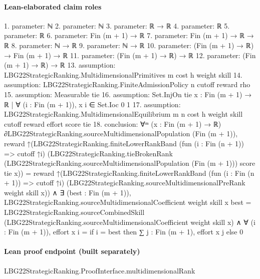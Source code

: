 \documentclass[10pt]{article}
\begin{document}
\paragraph{Lean-elaborated claim roles}\begin{ReviewVerbatim}
1. parameter: ℕ
2. parameter: ℕ
3. parameter: ℝ → ℝ
4. parameter: ℝ
5. parameter: ℝ
6. parameter: Fin (m + 1) → ℝ
7. parameter: Fin (m + 1) → ℝ → ℝ
8. parameter: ℕ → ℝ
9. parameter: ℕ → ℝ
10. parameter: (Fin (m + 1) → ℝ) → Fin (m + 1) → ℝ
11. parameter: (Fin (m + 1) → ℝ) → ℝ
12. parameter: (Fin (m + 1) → ℝ) → ℝ
13. assumption: LBG22StrategicRanking.MultidimensionalPrimitives m cost h weight skill
14. assumption: LBG22StrategicRanking.FiniteAdmissionPolicy n cutoff reward rho
15. assumption: Measurable tie
16. assumption: Set.InjOn tie {x : Fin (m + 1) → ℝ | ∀ (i : Fin (m + 1)), x i ∈ Set.Ioc 0 1}
17. assumption: LBG22StrategicRanking.MultidimensionalEquilibrium m n cost h weight skill cutoff reward effort score tie
18. conclusion: ∀ᵐ (x : Fin (m + 1) → ℝ) ∂LBG22StrategicRanking.sourceMultidimensionalPopulation (Fin (m + 1)),
  reward
        ↑(LBG22StrategicRanking.finiteLowerRankBand (fun (i : Fin (n + 1)) => cutoff ↑i)
            (LBG22StrategicRanking.tieBrokenRank (LBG22StrategicRanking.sourceMultidimensionalPopulation (Fin (m + 1)))
              score tie x)) =
      reward
        ↑(LBG22StrategicRanking.finiteLowerRankBand (fun (i : Fin (n + 1)) => cutoff ↑i)
            (LBG22StrategicRanking.sourceMultidimensionalPreRank weight skill x)) ∧
    ∃ (best : Fin (m + 1)),
      LBG22StrategicRanking.sourceMultidimensionalCoefficient weight skill x best =
          LBG22StrategicRanking.sourceCombinedSkill
            (LBG22StrategicRanking.sourceMultidimensionalCoefficient weight skill x) ∧
        ∀ (i : Fin (m + 1)), effort x i = if i = best then ∑ j : Fin (m + 1), effort x j else 0
\end{ReviewVerbatim}

\paragraph{Lean proof endpoint (built separately)}\begin{ReviewVerbatim}
LBG22StrategicRanking.ProofInterface.multidimensionalRank
\end{ReviewVerbatim}
\end{document}
